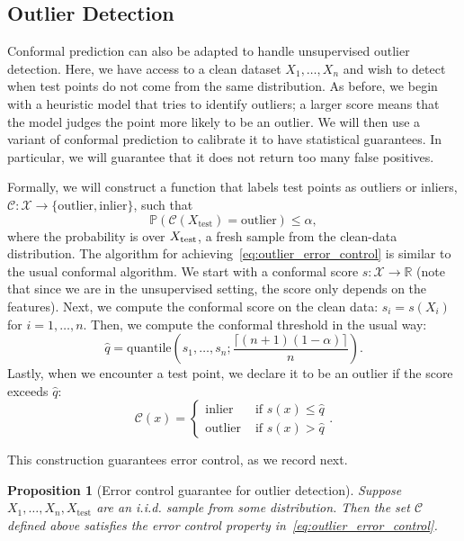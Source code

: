 \documentclass[10pt]{article}
\newtheorem{prop}{Proposition}
\def\R{\mathbb{R}}
\newcommand{\X}{\mathcal{X}}
\newcommand{\C}{\mathcal{C}}
\renewcommand{\P}{\mathbb{P}}
\begin{document}
\subsection{Outlier Detection}
\label{subsec:outlier}
Conformal prediction can also be adapted to handle unsupervised outlier detection. 
Here, we have access to a clean dataset $X_1,\dots,X_n$ and wish to detect when test points do not come from the same distribution. 
As before, we begin with a heuristic model that tries to identify outliers;
a larger score means that the model judges the point more likely to be an outlier.
We will then use a variant of conformal prediction to calibrate it
to have statistical guarantees. In particular, we will
guarantee that it does not return too many false positives. 

Formally, we will construct a function that labels test points as outliers or inliers, $\C : \X \to \{\text{outlier}, \text{inlier}\}$, such that
\begin{equation}
\label{eq:outlier_error_control}
    \P\left(\C(X_\text{test}) = \text{outlier}\right) \le \alpha,
\end{equation}
where the probability is over $X_{\rm test}$, a fresh sample from the clean-data distribution.
The algorithm for achieving~\eqref{eq:outlier_error_control} is similar to the 
usual conformal algorithm. We start with a conformal score $s : \mathcal{X} \to \R$ (note that 
since we are in the unsupervised setting, the score only depends on the features).
Next, we compute the conformal score on the clean data: $s_i = s(X_i)$ for $i=1,\dots,n$.
Then, we compute the conformal threshold in the usual way:
\begin{equation*}
    \hat{q} = \text{quantile}\left(s_1,\ldots ,s_n; \frac{\big\lceil (n+1)(1-\alpha) \big\rceil}{n}\right).
\end{equation*}
Lastly, when we encounter a test point, we declare it to be an outlier if the 
score exceeds $\hat{q}$:
\begin{equation*}
    \C(x) = \begin{cases}
    \text{inlier} & \text{ if } s(x) \le \hat{q} \\
    \text{outlier} & \text{ if } s(x) > \hat{q}
    \end{cases}.
\end{equation*}

This construction guarantees error control, as we record next.
\begin{prop}[Error control guarantee for outlier detection]
\label{prop:outlier}
Suppose $X_1,\dots,X_n,X_{\text{test}}$ are an i.i.d. sample from some distribution.
Then the set $\C$ defined above satisfies the error control property in~\eqref{eq:outlier_error_control}.
\end{prop}
\end{document}
